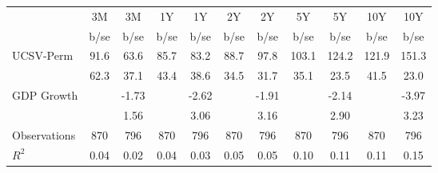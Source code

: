\begin{tabular*}{0.8\hsize}{@{\hskip\tabcolsep\extracolsep\fill}l*{10}{c}}
                    &\multicolumn{1}{c}{3M}&\multicolumn{1}{c}{3M}&\multicolumn{1}{c}{1Y}&\multicolumn{1}{c}{1Y}&\multicolumn{1}{c}{2Y}&\multicolumn{1}{c}{2Y}&\multicolumn{1}{c}{5Y}&\multicolumn{1}{c}{5Y}&\multicolumn{1}{c}{10Y}&\multicolumn{1}{c}{10Y}\\
                    &        b/se&        b/se&        b/se&        b/se&        b/se&        b/se&        b/se&        b/se&        b/se&        b/se\\
UCSV-Perm           &        91.6&        63.6&        85.7&        83.2&        88.7&        97.8&       103.1&       124.2&       121.9&       151.3\\
                    &        62.3&        37.1&        43.4&        38.6&        34.5&        31.7&        35.1&        23.5&        41.5&        23.0\\
GDP Growth          &            &       -1.73&            &       -2.62&            &       -1.91&            &       -2.14&            &       -3.97\\
                    &            &        1.56&            &        3.06&            &        3.16&            &        2.90&            &        3.23\\
Observations        &         870&         796&         870&         796&         870&         796&         870&         796&         870&         796\\
\(R^{2}\)           &        0.04&        0.02&        0.04&        0.03&        0.05&        0.05&        0.10&        0.11&        0.11&        0.15\\
\end{tabular*}
